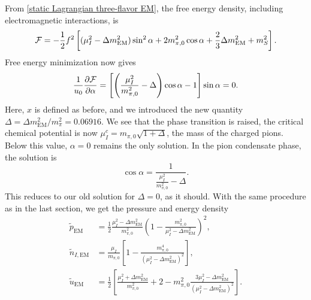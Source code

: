 From \autoref{static Lagrangian three-flavor EM}, the free energy density, including electromagnetic interactions, is
%
\begin{equation}
    \mathcal{F} =
    -\frac{1}{2} f^2
    \left[
        (\mu_I^2 - \Delta m_\text{EM}^2)\sin^2\alpha + 2 m_{\pi,0}^2\cos\alpha 
        + \frac{2}{3}\Delta m_\text{EM}^2 + m_S^2
    \right].
\end{equation}
%
Free energy minimization now gives
%
\begin{equation}
    \frac{1}{u_0}\pdv{\mathcal{F}}{\alpha}
    = 
    \left[ \left( \frac{\mu_I^2}{m_{\pi,0}^2} - \Delta \right) \cos \alpha - 1\right] \sin \alpha = 0.
\end{equation}
%
Here, $x$ is defined as before, and we introduced the new quantity $\Delta = \Delta m_{\text{EM}}^2 / m_\pi^2= 0.06916$.
We see that the phase transition is raised, the critical chemical potential is now $\mu_I^c = m_{\pi,0} \sqrt{1 + \Delta}$, the mass of the charged pions.
Below this value, $\alpha = 0$ remains the only solution.
In the pion condensate phase, the solution is
%
\begin{equation}
    \cos \alpha 
    = \frac{1}{\frac{\mu_I^2}{m_{\pi,0}^2} -  \Delta}.
\end{equation}
%
This reduces to our old solution for $\Delta = 0$, as it should.
With the same procedure as in the last section, we get the pressure and energy density
%
\begin{align}
    \label{pressure with em interaction}
    \tilde p_\text{EM}
    & = \frac{1}{2} \frac{\mu_I^2 - \Delta m_\text{EM}^2}{m_{\pi,0}^2}
    \left(
        1-  \frac{m_{\pi,0}^2}{ \mu_I^2 - \Delta m_\text{EM}^2 }
    \right)^2, \\
    \tilde n_{I,\text{EM}} & =
    \frac{\mu_I}{m_{\pi,0}}
    \left[  1 - \frac{m_{\pi,0}^4}{(\mu_I^2 - \Delta m_\text{EM}^2)^2} \right],\\
    \tilde u_\text{EM}
    &= \frac{1}{2} 
    \left[
        \frac{\mu_I^2+\Delta m_\text{EM}^2}{m_{\pi,0}^2}+ 2
        - m_{\pi,0}^2 \frac{3 {\mu_I^2} - \Delta m_\text{EM}^2}
        {\left( \mu_I^2- \Delta m_\text{EM}^2\right)^2}
    \right].
\end{align}
